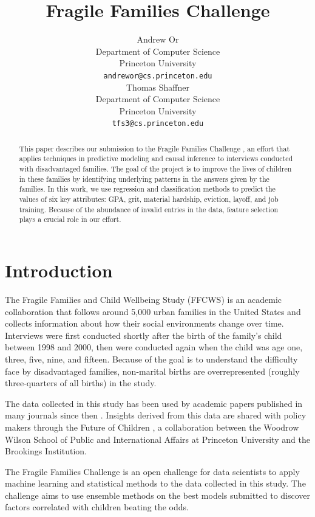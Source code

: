 \documentclass{article} %
\title{Fragile Families Challenge}
\author{
Andrew Or\\
Department of Computer Science\\
Princeton University\\
\texttt{andrewor@cs.princeton.edu} \\
\And
Thomas Shaffner \\
Department of Computer Science \\
Princeton University \\
\texttt{tfs3@cs.princeton.edu} \\
}
\begin{document}
\maketitle

\begin{abstract}

This paper describes our submission to the Fragile Families Challenge \cite{ffc}, an effort that applies techniques in predictive modeling and causal inference to interviews conducted with disadvantaged families. The goal of the project is to improve the lives of children in these families by identifying underlying patterns in the answers given by the families. In this work, we use regression and classification methods to predict the values of six key attributes: GPA, grit, material hardship, eviction, layoff, and job training. Because of the abundance of invalid entries in the data, feature selection plays a crucial role in our effort.

\end{abstract}
\section{Introduction}
\label{sec:intro}

The Fragile Families and Child Wellbeing Study (FFCWS) \cite{ffcws} is an academic collaboration that follows around 5,000 urban families in the United States and collects information about how their social environments change over time. Interviews were first conducted shortly after the birth of the family's child between 1998 and 2000, then were conducted again when the child was age one, three, five, nine, and fifteen. Because of the goal is to understand the difficulty face by disadvantaged families, non-marital births are overrepresented (roughly three-quarters of all births) in the study.

The data collected in this study has been used by academic papers published in many journals since then \cite{ffc_publications}. Insights derived from this data are shared with policy makers through the Future of Children \cite{foc}, a collaboration between the Woodrow Wilson School of Public and International Affairs at Princeton University and the Brookings Institution.

The Fragile Families Challenge is an open challenge for data scientists to apply machine learning and statistical methods to the data collected in this study. The challenge aims to use ensemble methods on the best models submitted to discover factors correlated with children beating the odds.
\end{document}
